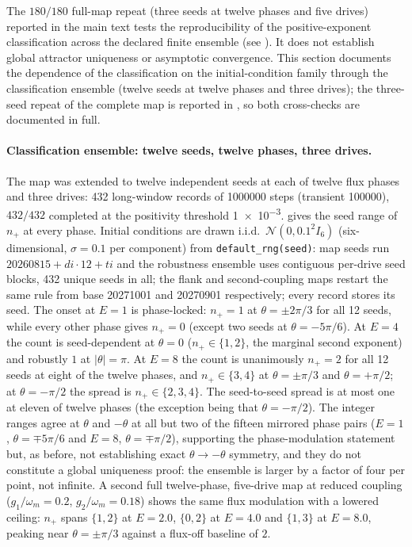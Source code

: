 \documentclass[preprint,numbers,a4paper]{elsarticle}
\begin{document}
The $\num{180}/\num{180}$ full-map repeat (three seeds at twelve phases and five drives) reported in the main text tests the reproducibility of the positive-exponent classification across the declared finite ensemble (see ). It does not establish global attractor uniqueness or asymptotic convergence. This section documents the dependence of the classification on the initial-condition family through the classification ensemble (twelve seeds at twelve phases and three drives); the three-seed repeat of the complete map is reported in , so both cross-checks are documented in full.

\paragraph{Classification ensemble: twelve seeds, twelve phases, three drives.}
The map was extended to twelve independent seeds at each of twelve flux phases and three drives: \num{432} long-window records of \num{1000000} steps (transient \num{100000}), $\num{432}/\num{432}$ completed at the positivity threshold \num{1e-3}.  gives the seed range of $n_{+}$ at every phase. Initial conditions are drawn i.i.d.\ $\mathcal{N}(0,0.1^2I_6)$ (six-dimensional, $\sigma=\num{0.1}$ per component) from \texttt{default\_rng(seed)}: map seeds run $20260815+di\cdot12+ti$ and the robustness ensemble uses contiguous per-drive seed blocks, \num{432} unique seeds in all; the flank and second-coupling maps restart the same rule from base \num{20271001} and \num{20270901} respectively; every record stores its seed. The onset at $E=\num{1}$ is phase-locked: $n_{+}=1$ at $\theta=\pm2\pi/3$ for all \num{12} seeds, while every other phase gives $n_{+}=0$ (except two seeds at $\theta=-5\pi/6$). At $E=\num{4}$ the count is seed-dependent at $\theta=0$ ($n_+\in\{1,2\}$, the marginal second exponent) and robustly $1$ at $|\theta|=\pi$. At $E=\num{8}$ the count is unanimously $n_{+}=2$ for all \num{12} seeds at eight of the twelve phases, and $n_{+}\in\{3,4\}$ at $\theta=\pm\pi/3$ and $\theta=+\pi/2$; at $\theta=-\pi/2$ the spread is $n_+\in\{2,3,4\}$. The seed-to-seed spread is at most one at eleven of twelve phases (the exception being that $\theta=-\pi/2$). The integer ranges agree at $\theta$ and $-\theta$ at all but two of the fifteen mirrored phase pairs ($E=\num{1}$, $\theta=\mp5\pi/6$ and $E=\num{8}$, $\theta=\mp\pi/2$), supporting the phase-modulation statement but, as before, not establishing exact $\theta\to-\theta$ symmetry, and they do not constitute a global uniqueness proof: the ensemble is larger by a factor of four per point, not infinite. A second full twelve-phase, five-drive map at reduced coupling ($g_1/\omega_m=\num{0.2}$, $g_2/\omega_m=\num{0.18}$) shows the same flux modulation with a lowered ceiling: $n_+$ spans $\{1,2\}$ at $E=\num{2.0}$, $\{0,2\}$ at $E=\num{4.0}$ and $\{1,3\}$ at $E=\num{8.0}$, peaking near $\theta=\pm\pi/3$ against a flux-off baseline of $2$.
\end{document}

